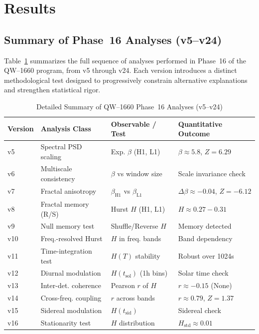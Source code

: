 \documentclass[11pt,a4paper]{article}
\begin{document}
\section{Results}

\subsection{Summary of Phase~16 Analyses (v5--v24)}
Table~\ref{tab:v5_v24_summary} summarizes the full sequence of analyses performed in Phase~16 of the QW--1660 program, from v5 through v24. Each version introduces a distinct methodological test designed to progressively constrain alternative explanations and strengthen statistical rigor.

\begin{longtable}{p{1.3cm}p{4.8cm}p{4.5cm}p{3.4cm}}
\caption{Detailed Summary of QW--1660 Phase~16 Analyses (v5--v24)}\label{tab:v5_v24_summary}\\
\toprule
\textbf{Version} & \textbf{Analysis Class} & \textbf{Observable / Test} & \textbf{Quantitative Outcome} \\
\midrule
v5 & Spectral PSD scaling & Exp. $\beta$ (H1, L1) & $\beta \approx 5.8$, $Z=6.29$ \\
v6 & Multiscale consistency & $\beta$ vs window size & Scale invariance check \\
v7 & Fractal anisotropy & $\beta_{\text{H1}}$ vs $\beta_{\text{L1}}$ & $\Delta\beta \approx -0.04$, $Z=-6.12$ \\
v8 & Fractal memory (R/S) & Hurst $H$ (H1, L1) & $H \approx 0.27-0.31$ \\
v9 & Null memory test & Shuffle/Reverse $H$ & Memory detected \\
v10 & Freq.-resolved Hurst & $H$ in freq. bands & Band dependency \\
v11 & Time-integration test & $H(T)$ stability & Robust over 1024s \\
v12 & Diurnal modulation & $H(t_{\text{sol}})$ (1h bins) & Solar time check \\
v13 & Inter-det. coherence & Pearson $r$ of $H$ & $r \approx -0.15$ (None) \\
v14 & Cross-freq. coupling & $r$ across bands & $r \approx 0.79$, $Z=1.37$ \\
v15 & Sidereal modulation & $H(t_{\text{sid}})$ & Sidereal check \\
v16 & Stationarity test & $H$ distribution & $H_{\text{std}} \approx 0.01$ \\

\end{longtable}
\end{document}
